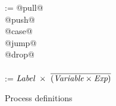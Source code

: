 \begin{figure}
\begin{minipage}[t]{0.4\textwidth}
\begin{tabbing}
\Instr
    \> :=\> @pull@  \> \Chan  \> \Var  \> \Next \\
    \TABALT @push@  \> \Chan  \> \Exp  \> \Next \\
    \TABALT @case@  \> \Exp   \> \Next \> \Next \\
    \TABALT @jump@  \>        \>       \> \Next \\
    \TABALT @drop@  \> \Chan  \>       \> \Next \\
\\[0.5em]

\Next \> := \> $\textit{Label}~\times~\overline{(\textit{Variable} \times \textit{Exp})}$ \\
\end{tabbing}
\end{minipage}
\caption{Process definitions}
\label{fig:Process:Def}
\end{figure}

